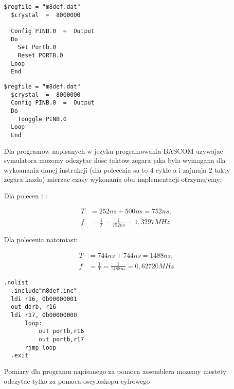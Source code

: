 \documentclass{article}
\begin{document}
\begin{lstlisting}[language=VBScript , caption=Instrukcje Set i Reset]
  $regfile = "m8def.dat"
  $crystal  =  8000000  
  
  Config PINB.0  =  Output
  Do
    Set Portb.0
    Reset PORTB.0
  Loop
  End     
\end{lstlisting}

\begin{lstlisting}[language=VBScript , caption=Instrukcje Toggle]
  $regfile = "m8def.dat"
  $crystal  =  8000000
  Config PINB.0  =  Output
  Do                                    
    Tooggle PINB.0
  Loop
  End 
\end{lstlisting}

Dla programow napisanych w jezyku programowania BASCOM uzywajac symulatora mozemy odczytac ilosc taktow zegara jaka byla wymagana dla wykoanania danej instrukcji (dla polecenia  sa to 4 cykle a  i  zajmuja 2 takty zegara kazda) mierzac czasy wykonania obu implementacji otrzymujemy:

Dla polecen  i :

\begin{equation}
  \begin{split}
    T &= 252 ns + 500 ns = 752 ns,\\
    f &= \frac{1}{T} = \frac{1}{752ns} = 1,3297MHz
  \end{split}
\end{equation}

Dla polecenia  natomiast:

\begin{equation}
  \begin{split}
    T &= 744ns + 744ns  = 1488ns,\\
    f &= \frac{1}{T} = \frac{1}{1488ns} = 0,62720MHz
  \end{split}
\end{equation}




\begin{lstlisting}[language=VBScript , caption=Implementacja w assemblerze]
  .nolist
  .include"m8def.inc"
  ldi r16, 0b00000001
  out ddrb, r16
  ldi r17, 0b00000000
      loop:
          out portb,r16
          out portb,r17
      rjmp loop
  .exit
\end{lstlisting}

Pomiary dla programu napisanego za pomoca assemblera mozemy niestety odczytac tylko za pomoca oscyloskopu cyfrowego
\end{document}
